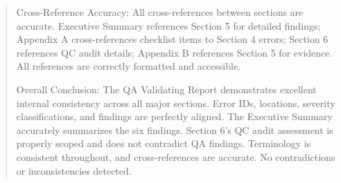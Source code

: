 \documentclass[11pt,a4paper]{article}
\begin{document}
\begin{quote}
Cross-Reference Accuracy: All cross-references between sections are accurate. Executive Summary references Section 5 for detailed findings; Appendix A cross-references checklist items to Section 4 errors; Section 6 references QC audit details; Appendix B references Section 5 for evidence. All references are correctly formatted and accessible.

Overall Conclusion: The QA Validating Report demonstrates excellent internal consistency across all major sections. Error IDs, locations, severity classifications, and findings are perfectly aligned. The Executive Summary accurately summarizes the six findings. Section 6's QC audit assessment is properly scoped and does not contradict QA findings. Terminology is consistent throughout, and cross-references are accurate. No contradictions or inconsistencies detected.
\end{quote}
\end{document}
